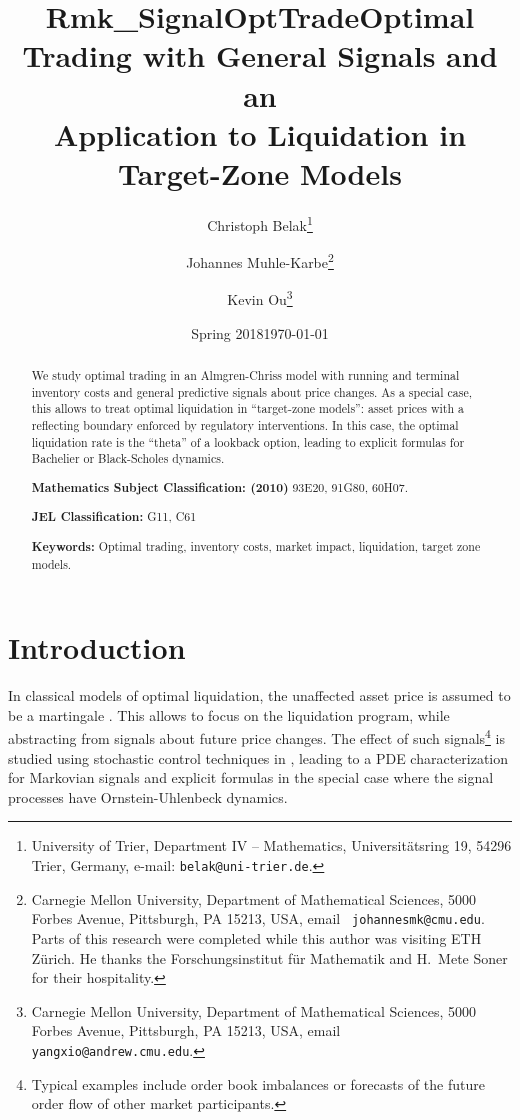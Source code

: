 \documentclass[11pt]{article}
\title{Rmk_SignalOptTrade}
\date{Spring 2018}
\numberwithin{equation}{section}
\theoremstyle{definition}
\theoremstyle{remark}
\begin{document}
\title{Optimal Trading with General Signals and an \\ Application to Liquidation in Target-Zone Models}

\author{
Christoph Belak\thanks{University of Trier, Department IV -- Mathematics, Universit\"atsring 19, 54296 Trier, Germany, e-mail: \texttt{belak@uni-trier.de}.}
\and
Johannes Muhle-Karbe\thanks{Carnegie Mellon University, Department of Mathematical Sciences, 5000 Forbes Avenue, Pittsburgh, PA 15213, USA, email \texttt{ johannesmk@cmu.edu}. Parts of this research were completed while this author was visiting ETH Z\"urich. He thanks the Forschungsinstitut f\"ur Mathematik and H.~Mete Soner for their hospitality. }
\and
Kevin Ou\thanks{Carnegie Mellon University, Department of Mathematical Sciences, 5000 Forbes Avenue, Pittsburgh, PA 15213, USA, email \texttt{ yangxio@andrew.cmu.edu}.}
}

\date{\today}

\maketitle

\begin{abstract}
We study optimal trading in an Almgren-Chriss model with running and terminal inventory costs and  general predictive signals about price changes. As a special case, this allows to treat optimal liquidation in ``target-zone models'': asset prices with a reflecting boundary enforced by regulatory interventions. In this case, the optimal liquidation rate is the ``theta'' of a lookback option, leading to explicit formulas for Bachelier or Black-Scholes dynamics.
 
\bigskip
\noindent\textbf{Mathematics Subject Classification: (2010)} 93E20, 91G80, 60H07.

\bigskip
\noindent\textbf{JEL Classification:} G11, C61

\bigskip
\noindent\textbf{Keywords:} Optimal trading, inventory costs, market impact, liquidation, target zone models.

\end{abstract}




\section{Introduction}

In classical models of optimal liquidation, the unaffected asset price is assumed to be a martingale \cite{bertsimas.lo.98,almgren2001optimal,obizhaeva.wang.13,alfonsi.al.10,predoiu.al.11}. This allows to focus on the liquidation program, while abstracting from signals about future price changes. The effect of such signals\footnote{Typical examples include order book imbalances or forecasts of the future order flow of other market participants.} is studied using stochastic control techniques in \cite{cartea.jaimungal.16,lehalle2017incorporating}, leading to a PDE characterization for Markovian signals and explicit formulas in the special case where the signal processes have Ornstein-Uhlenbeck dynamics. 
\end{document}

